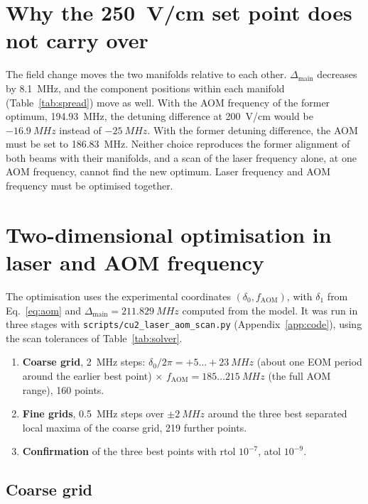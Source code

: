 \documentclass[11pt,a4paper,oneside]{report}
\newcommand{\code}[1]{\texttt{#1}}
\newcommand{\fAOM}{f_{\mathrm{AOM}}}
\newcommand{\Dmain}{\Delta_{\mathrm{main}}}
\begin{document}
\section{Why the \SI{250}{V/cm} set point does not carry over}

The field change moves the two manifolds relative to each other. $\Dmain$ decreases by
\SI{8.1}{MHz}, and the component positions within each manifold (Table~\ref{tab:spread}) move
as well. With the AOM frequency of the former optimum, \SI{194.93}{MHz}, the detuning
difference at \SI{200}{V/cm} would be $-\SI{16.9}{MHz}$ instead of $-\SI{25}{MHz}$. With the
former detuning difference, the AOM must be set to \SI{186.83}{MHz}. Neither choice
reproduces the former alignment of both beams with their manifolds, and a scan of the laser
frequency alone, at one AOM frequency, cannot find the new optimum. Laser frequency and AOM
frequency must be optimised together.

\section{Two-dimensional optimisation in laser and AOM frequency}
\label{sec:j2_2d}

The optimisation uses the experimental coordinates $(\delta_0,\fAOM)$, with $\delta_1$ from
Eq.~\eqref{eq:aom} and $\Dmain=\SI{211.829}{MHz}$ computed from the model. It was run in three
stages with \code{scripts/cu2\_laser\_aom\_scan.py} (Appendix~\ref{app:code}), using the scan
tolerances of Table~\ref{tab:solver}.
\begin{enumerate}
  \item \textbf{Coarse grid}, \SI{2}{MHz} steps: $\delta_0/2\pi=+5\ldots+\SI{23}{MHz}$ (about
        one EOM period around the earlier best point) $\times$ $\fAOM=185\ldots\SI{215}{MHz}$
        (the full AOM range), 160 points.
  \item \textbf{Fine grids}, \SI{0.5}{MHz} steps over $\pm\SI{2}{MHz}$ around the three best
        separated local maxima of the coarse grid, 219 further points.
  \item \textbf{Confirmation} of the three best points with rtol $10^{-7}$, atol $10^{-9}$.
\end{enumerate}

\subsection{Coarse grid}
\end{document}
